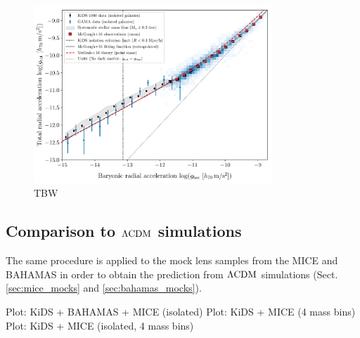\documentclass[usenatbib]{mnras}
\newcommand{\lcdm}{{\rm \Lambda CDM}}
\begin{document}
\begin{figure}
	\includegraphics[width=0.8\textwidth]{Figures/RAR_KiDS+GAMA+Verlinde_Nobins_isolated_zoomout.pdf}
	\caption{TBW}
	\label{fig:RAR_kids_gama_iso}
\end{figure}

\subsection{Comparison to $\lcdm$ simulations}

The same procedure is applied to the mock lens samples from the MICE and BAHAMAS in order to obtain the prediction from $\lcdm$ simulations (Sect. \ref{sec:mice_mocks} and \ref{sec:bahamas_mocks}).

Plot: KiDS + BAHAMAS + MICE (isolated)
Plot: KiDS + MICE (4 mass bins)
Plot: KiDS + MICE (isolated, 4 mass bins)

\end{document}
